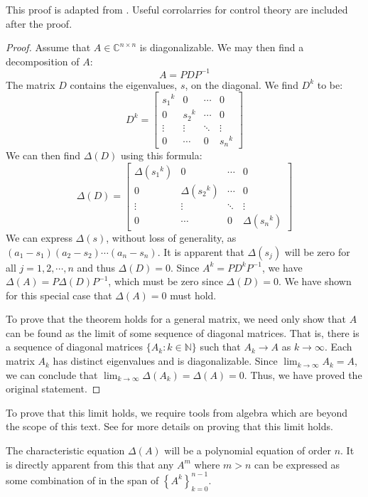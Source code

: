 This proof is adapted from \cite{eliashberg_cayley_2011}. Useful corrolarries for control theory are included after the proof.
\begin{proof}
    Assume that $A\in \mathbb{C}^{n\times n}$ is diagonalizable. We may then find a decomposition of $A$:
    $$A=PDP^{-1}$$
The matrix $D$ contains the eigenvalues, $s$, on the diagonal. We find $D^k$ to be:
    $$D^k=\begin{bmatrix}
        {s_1}^k&0&\cdots  &0\\
        0&{s_2}^k&\cdots &0\\
        \vdots&\vdots&\ddots&\vdots\\
        0&\cdots&0&{s_n}^k
    \end{bmatrix}$$
    We can then find $\Delta(D)$ using this formula:
    $$\Delta (D)=\begin{bmatrix}
        \Delta\left({s_1}^k\right)&0&\cdots  &0\\
        0&\Delta\left({s_2}^k\right)&\cdots &0\\
        \vdots&\vdots&\ddots&\vdots\\
        0&\cdots&0&\Delta\left({s_n}^k\right)
    \end{bmatrix}$$
We can express $\Delta(s)$, without loss of generality, as $(a_1-s_1)(a_2-s_2)\cdots(a_n-s_n)$. It is apparent that $\Delta(s_j)$ will be zero for all $j=1,2,\cdots,n$ and thus $\Delta(D)=0$.  Since $A^k=PD^kP^{-1}$, we have $\Delta(A)=P\Delta(D)P^{-1}$, which must be zero since $\Delta(D)=0$. We have shown for this special case that $\Delta(A)=0$ must hold.

To prove that the theorem holds for a general matrix, we need only show that $A$ can be found as the limit of some sequence of diagonal matrices. That is, there is a sequence of diagonal matrices $\{A_k:k\in\mathbb{N}\}$ such that $A_k\rightarrow A$ as $k\rightarrow\infty$. Each matrix $A_k$ has distinct eigenvalues and is diagonalizable. Since $\lim_{k\rightarrow\infty}{A_k=A}$, we can conclude that $\lim_{k\rightarrow\infty}\Delta(A_k)=\Delta(A)=0$. Thus, we have proved the original statement.
\end{proof}
To prove that this limit holds, we require tools from algebra which are beyond the scope of this text. See \cite{eliashberg_cayley_2011} for more details on proving that this limit holds.

\begin{corollary}
The characteristic equation $\Delta(A)$ will be a polynomial equation of order $n$. It is directly apparent from this that any $A^m$ where $m>n$ can be expressed as some combination of in the span of $\left\{A^k\right\}_{k=0}^{n-1}$.
\end{corollary}

